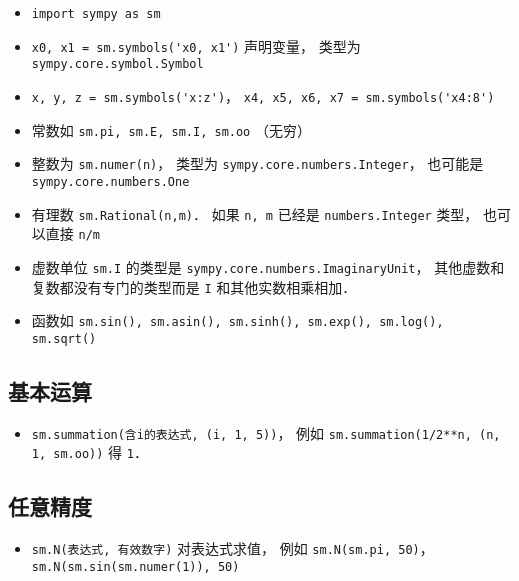 
\begin{issues}
\issueDraft
\end{issues}


\begin{itemize}
\item \verb|import sympy as sm|
\item \verb|x0, x1 = sm.symbols('x0, x1')| 声明变量， 类型为 \verb|sympy.core.symbol.Symbol|
\item \verb|x, y, z = sm.symbols('x:z')|， \verb|x4, x5, x6, x7 = sm.symbols('x4:8')|
\item 常数如 \verb|sm.pi, sm.E, sm.I, sm.oo| （无穷）
\item 整数为 \verb|sm.numer(n)|， 类型为 \verb|sympy.core.numbers.Integer|， 也可能是 \verb|sympy.core.numbers.One|
\item 有理数 \verb|sm.Rational(n,m)|． 如果 \verb|n, m| 已经是 \verb|numbers.Integer| 类型， 也可以直接 \verb|n/m|
\item 虚数单位 \verb|sm.I| 的类型是 \verb|sympy.core.numbers.ImaginaryUnit|， 其他虚数和复数都没有专门的类型而是 \verb|I| 和其他实数相乘相加．
\item 函数如 \verb|sm.sin(), sm.asin(), sm.sinh(), sm.exp(), sm.log(), sm.sqrt()|
\end{itemize}

\subsection{基本运算}
\begin{itemize}
\item \verb|sm.summation(含i的表达式, (i, 1, 5))|， 例如 \verb|sm.summation(1/2**n, (n, 1, sm.oo))| 得 \verb|1|．
\end{itemize}

\subsection{任意精度}
\begin{itemize}
\item \verb|sm.N(表达式, 有效数字)| 对表达式求值， 例如 \verb|sm.N(sm.pi, 50)|， \verb|sm.N(sm.sin(sm.numer(1)), 50)|
\end{itemize}

